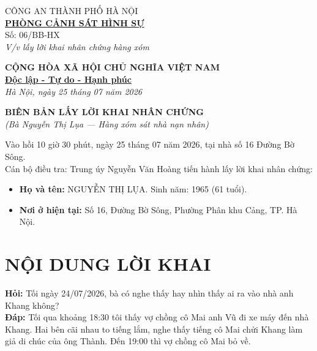 \documentclass[12pt,a4paper]{article}
\begin{document}
\noindent
\begin{minipage}[t]{0.45\textwidth}
    \begin{center}
        \small
        CÔNG AN THÀNH PHỐ HÀ NỘI\\
        \textbf{\underline{PHÒNG CẢNH SÁT HÌNH SỰ}}\\[0.1cm]
        Số: 06/BB-HX\\
        \textit{V/v lấy lời khai nhân chứng hàng xóm}
    \end{center}
\end{minipage}
\hfill
\begin{minipage}[t]{0.52\textwidth}
    \begin{center}
        \small
        \textbf{CỘNG HÒA XÃ HỘI CHỦ NGHĨA VIỆT NAM}\\
        \textbf{\underline{Độc lập - Tự do - Hạnh phúc}}\\[0.1cm]
        \textit{Hà Nội, ngày 25 tháng 07 năm 2026}
    \end{center}
\end{minipage}

\vspace{0.6cm}

\begin{center}
    \textbf{\large BIÊN BẢN LẤY LỜI KHAI NHÂN CHỨNG}\\
    \textit{(Bà Nguyễn Thị Lụa — Hàng xóm sát nhà nạn nhân)}
\end{center}

\vspace{0.3cm}

\noindent Vào hồi 10 giờ 30 phút, ngày 25 tháng 07 năm 2026, tại nhà số 16 Đường Bờ Sông.\\
Cán bộ điều tra: Trung úy Nguyễn Văn Hoàng tiến hành lấy lời khai nhân chứng:
\begin{itemize}[leftmargin=1.5cm]
    \item \textbf{Họ và tên:} NGUYỄN THỊ LỤA. Sinh năm: 1965 (61 tuổi).
    \item \textbf{Nơi ở hiện tại:} Số 16, Đường Bờ Sông, Phường Phân khu Cảng, TP. Hà Nội.
\end{itemize}

\section*{NỘI DUNG LỜI KHAI}

\noindent \textbf{Hỏi:} Tối ngày 24/07/2026, bà có nghe thấy hay nhìn thấy ai ra vào nhà anh Khang không?\\
\textbf{Đáp:} Tối qua khoảng 18:30 tôi thấy vợ chồng cô Mai anh Vũ đi xe máy đến nhà Khang. Hai bên cãi nhau to tiếng lắm, nghe thấy tiếng cô Mai chửi Khang làm giả di chúc của ông Thành. Đến 19:00 thì vợ chồng cô Mai bỏ về.
\end{document}
